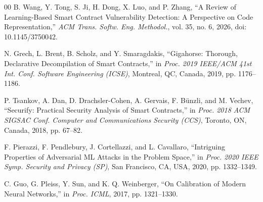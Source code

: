 \documentclass[conference]{IEEEtran}
\begin{document}
\begin{thebibliography}{00}
B. Wang, Y. Tong, S. Ji, H. Dong, X. Luo, and P. Zhang, ``A Review of Learning-Based Smart Contract Vulnerability Detection: A Perspective on Code Representation,'' \emph{ACM Trans. Softw. Eng. Methodol.}, vol. 35, no. 6, 2026, doi: 10.1145/3750042.

N. Grech, L. Brent, B. Scholz, and Y. Smaragdakis, ``Gigahorse: Thorough, Declarative Decompilation of Smart Contracts,'' in \emph{Proc. 2019 IEEE/ACM 41st Int. Conf. Software Engineering (ICSE)}, Montreal, QC, Canada, 2019, pp. 1176--1186.

P. Tsankov, A. Dan, D. Drachsler-Cohen, A. Gervais, F. Bünzli, and M. Vechev, ``Securify: Practical Security Analysis of Smart Contracts,'' in \emph{Proc. 2018 ACM SIGSAC Conf. Computer and Communications Security (CCS)}, Toronto, ON, Canada, 2018, pp. 67--82.

F. Pierazzi, F. Pendlebury, J. Cortellazzi, and L. Cavallaro, ``Intriguing Properties of Adversarial ML Attacks in the Problem Space,'' in \emph{Proc. 2020 IEEE Symp. Security and Privacy (SP)}, San Francisco, CA, USA, 2020, pp. 1332--1349.

C. Guo, G. Pleiss, Y. Sun, and K. Q. Weinberger, ``On Calibration of Modern Neural Networks,'' in \emph{Proc. ICML}, 2017, pp. 1321--1330.

\end{thebibliography}
\end{document}
